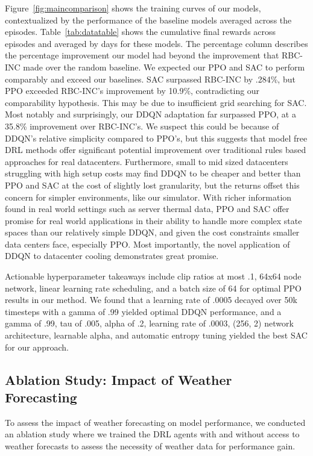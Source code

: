 \documentclass[12pt]{article}
\begin{document}
Figure~\ref{fig:maincomparison} shows the training curves of our models, contextualized by the performance of the baseline models averaged across the episodes. Table~\ref{tab:datatable} shows the cumulative final rewards across episodes and averaged by days for these models. The percentage column describes the percentage improvement our model had beyond the improvement that RBC-INC made over the random baseline. We expected our PPO and SAC to perform comparably and exceed our baselines. SAC surpassed RBC-INC by .284\%, but PPO exceeded RBC-INC's improvement by 10.9\%, contradicting our comparability hypothesis. This may be due to insufficient grid searching for SAC. Most notably and surprisingly, our DDQN adaptation far surpassed PPO, at a 35.8\% improvement over RBC-INC's. We suspect this could be because of DDQN's relative simplicity compared to PPO's, but this suggests that model free DRL methods offer significant potential improvement over traditional rules based approaches for real datacenters.
Furthermore, small to mid sized datacenters struggling with high setup costs may find DDQN to be cheaper and better than PPO and SAC at the cost of slightly lost granularity, but the returns offset this concern for simpler environments, like our simulator. With richer information found in real world settings such as server thermal data, PPO and SAC offer promise for real world applications in their ability to handle more complex state spaces than our relatively simple DDQN, and given the cost constraints smaller data centers face, especially PPO. Most importantly, the novel application of DDQN to datacenter cooling demonstrates great promise.

Actionable hyperparameter takeaways include clip ratios at most .1, 64x64 node network, linear learning rate scheduling, and a batch size of 64 for optimal PPO results in our method. We found that a learning rate of .0005 decayed over 50k timesteps with a gamma of .99 yielded optimal DDQN performance, and a gamma of .99, tau of .005, alpha of .2, learning rate of .0003, (256, 2) network architecture, learnable alpha, and automatic entropy tuning yielded the best SAC for our approach.

\subsection{Ablation Study: Impact of Weather Forecasting}

To assess the impact of weather forecasting on model performance, we conducted an ablation study where we trained the DRL agents with and without access to weather forecasts to assess the necessity of weather data for performance gain.
\end{document}
